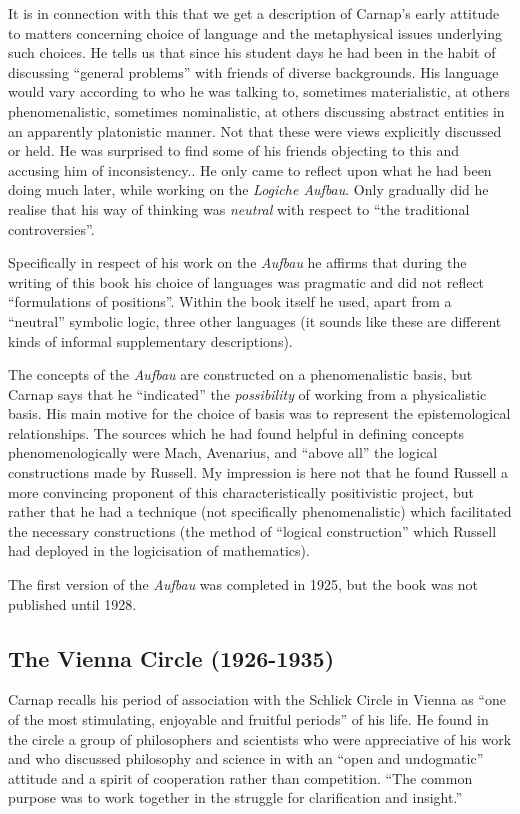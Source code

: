 \documentclass[10pt,titlepage]{book}
\begin{document}
It is in connection with this that we get a description of Carnap's early attitude to matters concerning choice of language and the metaphysical issues underlying such choices. 
He tells us that since his student days he had been in the habit of discussing ``general problems'' with friends of diverse backgrounds.
His language would vary according to who he was talking to, sometimes materialistic, at others phenomenalistic, sometimes nominalistic, at others discussing abstract entities in an apparently platonistic manner.
Not that these were views explicitly discussed or held.
He was surprised to find some of his friends objecting to this and accusing him of inconsistency..
He only came to reflect upon what he had been doing much later, while working on the \emph{Logiche Aufbau}.
Only gradually did he realise that his way of thinking was \emph{neutral} with respect to ``the traditional controversies''.

Specifically in respect of his work on the \emph{Aufbau} he affirms that during the writing of this book his choice of languages was pragmatic and did not reflect ``formulations of positions''.
Within the book itself he used, apart from a ``neutral'' symbolic logic, three other languages (it sounds like these are different kinds of informal supplementary descriptions).

The concepts of the \emph{Aufbau} are constructed on a phenomenalistic basis, but Carnap says that he ``indicated'' the \emph{possibility} of working from a physicalistic basis.
His main motive for the choice of basis was to represent the epistemological relationships.
The sources which he had found helpful in defining concepts phenomenologically were Mach, Avenarius, and ``above all'' the logical constructions made by Russell.
My impression is here not that he found Russell a more convincing proponent of this characteristically positivistic project, but rather that he had a technique (not specifically phenomenalistic) which facilitated the necessary constructions (the method of ``logical construction'' which Russell had deployed in the logicisation of mathematics).

The first version of the \emph{Aufbau} was completed in 1925, but the book was not published until 1928.

\subsection{The Vienna Circle (1926-1935)}

Carnap recalls his period of association with the Schlick Circle in Vienna as ``one of the most stimulating, enjoyable and fruitful periods'' of his life.
He found in the circle a group of philosophers and scientists who were appreciative of his work and who discussed philosophy and science in with an ``open and undogmatic'' attitude and a spirit of cooperation rather than competition.
``The common purpose was to work together in the struggle for clarification and insight.''
\end{document}
